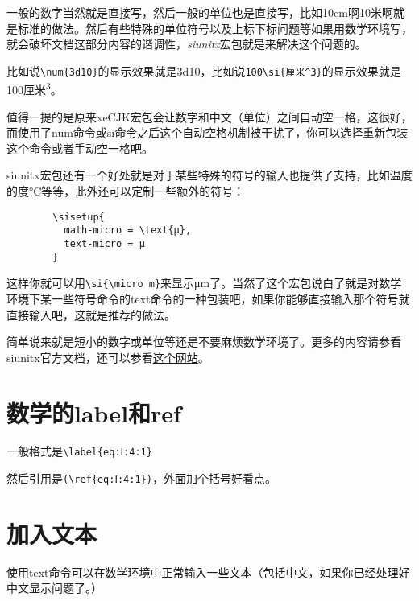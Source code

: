 \documentclass[11pt,oneside]{book}
\begin{document}
      一般的数字当然就是直接写，然后一般的单位也是直接写，比如10cm啊10米啊就是标准的做法。然后有些特殊的单位符号以及上标下标问题等如果用数学环境写，就会破坏文档这部分内容的谐调性，\emph{siunitx}宏包就是来解决这个问题的。

      比如说\verb+\num{3d10}+的显示效果就是\num{3d10}，比如说\verb+100\si{厘米^3}+的显示效果就是100\si{厘米^3}。

      值得一提的是原来xeCJK宏包会让数字和中文（单位）之间自动空一格，这很好，而使用了num命令或si命令之后这个自动空格机制被干扰了，你可以选择重新包装这个命令或者手动空一格吧。

      siunitx宏包还有一个好处就是对于某些特殊的符号的输入也提供了支持，比如温度的度\si{\degreeCelsius}等等，此外还可以定制一些额外的符号：
      \begin{Verbatim}
        \sisetup{
          math-micro = \text{μ},
          text-micro = μ
        }
      \end{Verbatim}
      这样你就可以用\verb+\si{\micro m}+来显示\si{\micro m}了。当然了这个宏包说白了就是对数学环境下某一些符号命令的text命令的一种包装吧，如果你能够直接输入那个符号就直接输入吧，这就是推荐的做法。

      简单说来就是短小的数字或单位等还是不要麻烦数学环境了。更多的内容请参看siunitx官方文档，还可以参看\href{http://tex.stackexchange.com/questions/37168/when-to-use-math-mode}{这个网站}。



      \section{数学的label和ref}
      一般格式是\verb+\label{eq:Ⅰ:4:1}+

      然后引用是\verb+(\ref{eq:Ⅰ:4:1})+，外面加个括号好看点。


      \section{加入文本}
      使用text命令可以在数学环境中正常输入一些文本（包括中文，如果你已经处理好中文显示问题了。）
\end{document}
